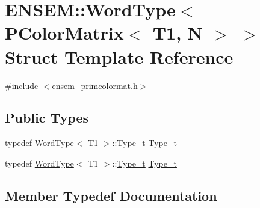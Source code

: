 \hypertarget{structENSEM_1_1WordType_3_01PColorMatrix_3_01T1_00_01N_01_4_01_4}{}\section{E\+N\+S\+EM\+:\+:Word\+Type$<$ P\+Color\+Matrix$<$ T1, N $>$ $>$ Struct Template Reference}
\label{structENSEM_1_1WordType_3_01PColorMatrix_3_01T1_00_01N_01_4_01_4}


{\ttfamily \#include $<$ensem\+\_\+primcolormat.\+h$>$}

\subsection*{Public Types}
\begin{DoxyCompactItemize}
\item 
typedef \mbox{\hyperlink{structENSEM_1_1WordType}{Word\+Type}}$<$ T1 $>$\+::\mbox{\hyperlink{structENSEM_1_1WordType_3_01PColorMatrix_3_01T1_00_01N_01_4_01_4_a32aa3b6b38804a81d375ed7a84abe6c7}{Type\+\_\+t}} \mbox{\hyperlink{structENSEM_1_1WordType_3_01PColorMatrix_3_01T1_00_01N_01_4_01_4_a32aa3b6b38804a81d375ed7a84abe6c7}{Type\+\_\+t}}
\item 
typedef \mbox{\hyperlink{structENSEM_1_1WordType}{Word\+Type}}$<$ T1 $>$\+::\mbox{\hyperlink{structENSEM_1_1WordType_3_01PColorMatrix_3_01T1_00_01N_01_4_01_4_a32aa3b6b38804a81d375ed7a84abe6c7}{Type\+\_\+t}} \mbox{\hyperlink{structENSEM_1_1WordType_3_01PColorMatrix_3_01T1_00_01N_01_4_01_4_a32aa3b6b38804a81d375ed7a84abe6c7}{Type\+\_\+t}}
\end{DoxyCompactItemize}


\subsection{Member Typedef Documentation}
\mbox{\label{structENSEM_1_1WordType_3_01PColorMatrix_3_01T1_00_01N_01_4_01_4_a32aa3b6b38804a81d375ed7a84abe6c7}} 
